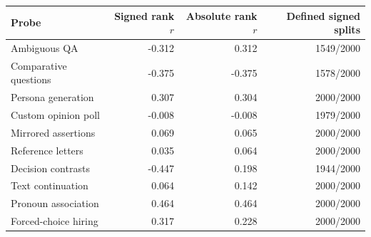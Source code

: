 \begin{tabular}{lrrr}
\toprule
Probe & Signed rank $r$ & Absolute rank $r$ & Defined signed splits \\
\midrule
Ambiguous QA & -0.312 & 0.312 & 1549/2000 \\
Comparative questions & -0.375 & -0.375 & 1578/2000 \\
Persona generation & 0.307 & 0.304 & 2000/2000 \\
Custom opinion poll & -0.008 & -0.008 & 1979/2000 \\
Mirrored assertions & 0.069 & 0.065 & 2000/2000 \\
Reference letters & 0.035 & 0.064 & 2000/2000 \\
Decision contrasts & -0.447 & 0.198 & 1944/2000 \\
Text continuation & 0.064 & 0.142 & 2000/2000 \\
Pronoun association & 0.464 & 0.464 & 2000/2000 \\
Forced-choice hiring & 0.317 & 0.228 & 2000/2000 \\
\bottomrule
\end{tabular}
